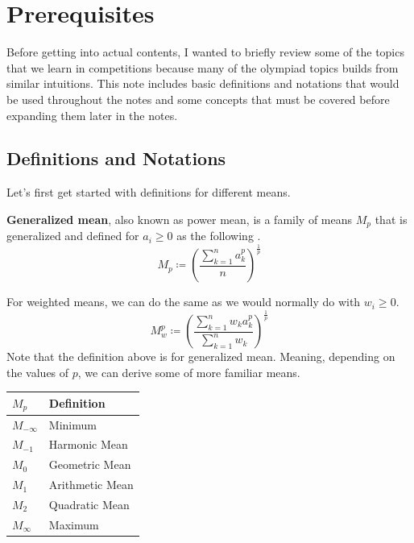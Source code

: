 \documentclass[../../main.tex]{subfiles}
\begin{document}
\chapter{Prerequisites}

Before getting into actual contents, I wanted to briefly review
some of the topics that we learn in competitions because many of
the olympiad topics builds from similar intuitions. This note
includes basic definitions and notations that would be used
throughout the notes and some concepts that must be covered before
expanding them later in the notes.

\section{Definitions and Notations}

Let's first get started with definitions for different means.

\begin{definition}{}{}
\textbf{Generalized mean}, also known as power mean, is a family of
means $M_p$ that is generalized and defined for $a_i \geq 0$ as the
following \cite{MATH01-4}.
\[
M_p
\coloneqq \left( \frac{\sum_{k=1}^n a_k^p}{n} \right)^\frac{1}{p}
\]
\end{definition}

For weighted means, we can do the same as we would normally do with
$w_i \geq 0$.
\[
M_w^p
\coloneqq \left(
    \frac{ \sum_{k=1}^n w_k a_k^p }{ \sum_{k=1}^n w_k }
\right)^\frac{1}{p}
\]
Note that the definition above is for generalized mean. Meaning,
depending on the values of $p$, we can derive some of more familiar
means.

\begin{center}
\begin{tabular}{|p{}|p{}|}
    \hline
    $M_p$         & Definition \\
    \hline
    $M_{-\infty}$ & Minimum \\
    $M_{-1}$      & Harmonic Mean \\
    $M_0$         & Geometric Mean \\
    $M_1$         & Arithmetic Mean \\
    $M_2$         & Quadratic Mean \\
    $M_\infty$    & Maximum \\
    \hline
\end{tabular}
\end{center}
\end{document}
